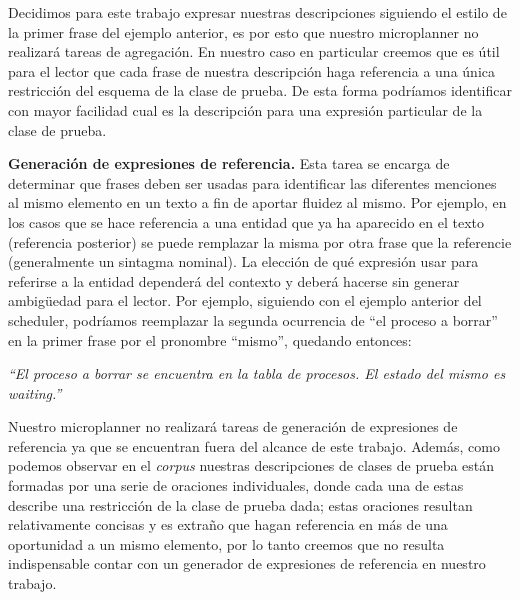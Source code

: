\medskip
\noindent
Decidimos para este trabajo expresar nuestras descripciones siguiendo el estilo de la primer frase del ejemplo anterior, es por esto que nuestro microplanner no realizará tareas de agregación. En nuestro caso en particular creemos que es útil para el lector que cada frase de nuestra descripción haga referencia a una única restricción del esquema de la clase de prueba. De esta forma podríamos identificar con mayor facilidad cual es la descripción para una expresión particular de la clase de prueba.


\medskip
\noindent
\textbf{Generación de expresiones de referencia.} Esta tarea se encarga de determinar que frases deben ser usadas para identificar las diferentes menciones al mismo elemento en un texto a fin de aportar fluidez al mismo. Por ejemplo, en los casos que se hace referencia a una entidad que ya ha aparecido en el texto (referencia posterior) se puede remplazar la misma por otra frase que la referencie (generalmente un sintagma nominal). La elección de qué expresión usar para referirse a la entidad dependerá del contexto y deberá hacerse sin generar ambigüedad para el lector. Por ejemplo, siguiendo con el ejemplo anterior del scheduler, podríamos reemplazar la segunda ocurrencia de ``el proceso a borrar'' en la primer frase por el pronombre ``mismo'', quedando entonces:

\smallskip
\begin{center}
\emph{``El proceso a borrar se encuentra en la tabla de procesos. El estado del mismo es waiting.''} 
\end{center}

\smallskip
Nuestro microplanner no realizará tareas de generación de expresiones de referencia ya que se encuentran fuera del alcance de este trabajo. Además, como podemos observar en el \emph{corpus} nuestras descripciones de clases de prueba están formadas por una serie de oraciones individuales, donde cada una de estas describe una restricción de la clase de prueba dada; estas oraciones resultan relativamente concisas y es extraño que hagan referencia en más de una oportunidad a un mismo elemento, por lo tanto creemos que no resulta indispensable contar con un generador de expresiones de referencia en nuestro trabajo.



